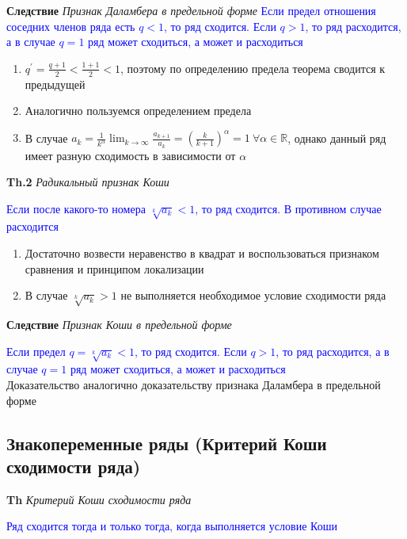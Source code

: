 \textbf{Следствие} \textit{Признак Даламбера в предельной форме} \textcolor{blue}{Если предел отношения соседних
членов ряда есть $q < 1$, то ряд сходится. Если $q > 1$, то ряд расходится, а в случае $q = 1$ ряд может
сходиться, а может и расходиться}

\begin{enumerate}
    \item $q^{'} = \frac{q+1}{2} < \frac{1 + 1}{2} < 1$, поэтому по определению предела теорема сводится к
    предыдущей
    \item Аналогично пользуемся определением предела
    \item В случае $a_k = \frac{1}{k^{\alpha}} \lim_{k\to\infty} \frac{a_{k+1}}{a_k} = \left(\frac{k}{k+1}\right)^{\alpha} = 1~
    \forall \alpha \in \mathbb{R}$, однако данный ряд имеет разную сходимость в зависимости от $\alpha$
\end{enumerate}

\textbf{Th.2} \textit{Радикальный признак Коши}

\textcolor{blue}{Если после какого-то номера $\sqrt[k]{a_k} < 1$,
    то ряд сходится. В противном случае расходится}

\begin{enumerate}
    \item Достаточно возвести неравенство в квадрат и воспользоваться признаком сравнения и принципом локализации
    \item В случае $\sqrt[k]{a_k} > 1$ не выполняется необходимое условие сходимости ряда
\end{enumerate}

\textbf{Следствие} \textit{Признак Коши в предельной форме}

\textcolor{blue}{Если предел $q = \sqrt[k]{a_k} < 1$, то
ряд сходится. Если $q > 1$, то ряд расходится, а в случае $q = 1$ ряд может сходиться, а может и расходиться} \\

Доказательство аналогично доказательству признака Даламбера в предельной форме

\subsection{Знакопеременные ряды (Критерий Коши сходимости ряда)}

\textbf{Th} \textit{Критерий Коши сходимости ряда}

\textcolor{blue}{Ряд сходится тогда и только тогда, когда выполняется условие Коши} \\

